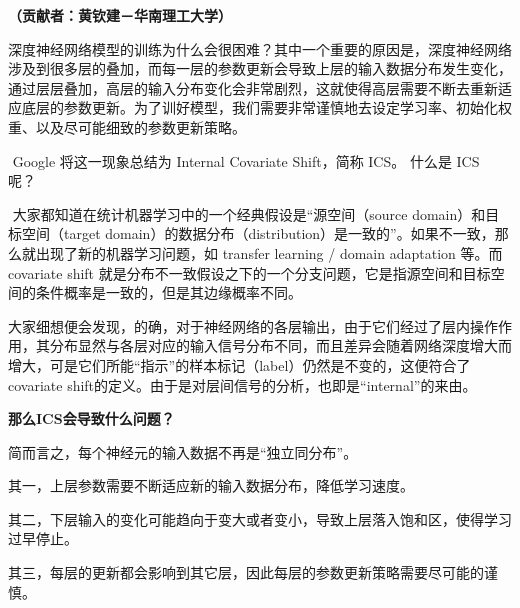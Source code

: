 \textbf{（贡献者：黄钦建－华南理工大学）}

​
深度神经网络模型的训练为什么会很困难？其中一个重要的原因是，深度神经网络涉及到很多层的叠加，而每一层的参数更新会导致上层的输入数据分布发生变化，通过层层叠加，高层的输入分布变化会非常剧烈，这就使得高层需要不断去重新适应底层的参数更新。为了训好模型，我们需要非常谨慎地去设定学习率、初始化权重、以及尽可能细致的参数更新策略。

​ Google 将这一现象总结为 Internal Covariate Shift，简称 ICS。 什么是
ICS 呢？

​ 大家都知道在统计机器学习中的一个经典假设是``源空间（source
domain）和目标空间（target
domain）的数据分布（distribution）是一致的''。如果不一致，那么就出现了新的机器学习问题，如
transfer learning / domain adaptation 等。而 covariate shift
就是分布不一致假设之下的一个分支问题，它是指源空间和目标空间的条件概率是一致的，但是其边缘概率不同。

​
大家细想便会发现，的确，对于神经网络的各层输出，由于它们经过了层内操作作用，其分布显然与各层对应的输入信号分布不同，而且差异会随着网络深度增大而增大，可是它们所能``指示''的样本标记（label）仍然是不变的，这便符合了covariate
shift的定义。由于是对层间信号的分析，也即是``internal''的来由。

\textbf{那么ICS会导致什么问题？}

简而言之，每个神经元的输入数据不再是``独立同分布''。

其一，上层参数需要不断适应新的输入数据分布，降低学习速度。

其二，下层输入的变化可能趋向于变大或者变小，导致上层落入饱和区，使得学习过早停止。

其三，每层的更新都会影响到其它层，因此每层的参数更新策略需要尽可能的谨慎。





